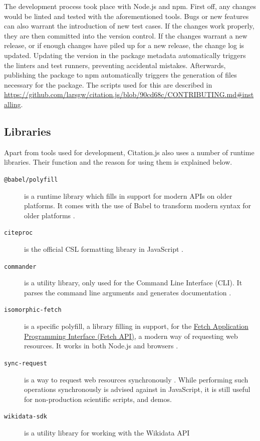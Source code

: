 \documentclass[fleqn,10pt,lineno]{wlpeerj} %
\begin{document}
The development process took place with Node.js and npm. First off, any changes would be linted and tested with the aforementioned tools. Bugs or new features can also warrant the introduction of new test cases. If the changes work properly, they are then committed into the version control. If the changes warrant a new release, or if enough changes have piled up for a new release, the change log is updated. Updating the version in the package metadata automatically triggers the linters and test runners, preventing accidental mistakes. Afterwards, publishing the package to npm automatically triggers the generation of files necessary for the package. The scripts used for this are described in \url{https://github.com/larsgw/citation.js/blob/90cd68c/CONTRIBUTING.md#installing}.

\subsection*{Libraries}

Apart from tools used for development, Citation.js also uses a number of runtime libraries. Their function and the reason for using them is explained below.

\begin{description}
\item[\texttt{@babel/polyfill}]
is a runtime library which fills in support for modern APIs on older platforms. It comes with the use of Babel to transform modern syntax for older platforms \citep{Zhu2018babel/babel}.

\item[\texttt{citeproc}]
is the official CSL formatting library in JavaScript \citep{Bennett2018Juris-M/citeproc-js,noauthor_csl_nodate}.

\item[\texttt{commander}]
is a utility library, only used for the Command Line Interface (CLI). It parses the command line arguments and generates documentation \citep{Holowaychuk2018tj/commander.js}.

\item[\texttt{isomorphic-fetch}]
is a specific polyfill, a library filling in support, for the \href{https://developer.mozilla.org/en-US/docs/Web/API/Fetch_API}{Fetch Application Programming Interface (Fetch API)}, a modern way of requesting web resources. It works in both Node.js and browsers \citep{Andrews2018matthew-andrews/isomorphic-fetch}.

\item[\texttt{sync-request}]
is a way to request web resources synchronously \citep{Lindesay2018ForbesLindesay/sync-request}. While performing such operations synchronously is advised against in JavaScript, it is still useful for non-production scientific scripts, and demos.

\item[\texttt{wikidata-sdk}]
is a utility library for working with the Wikidata API \citep{Lathuiliere2018maxlath/wikidata-sdk,vrandecic_wikidata:_2014}
\end{description}
\end{document}
